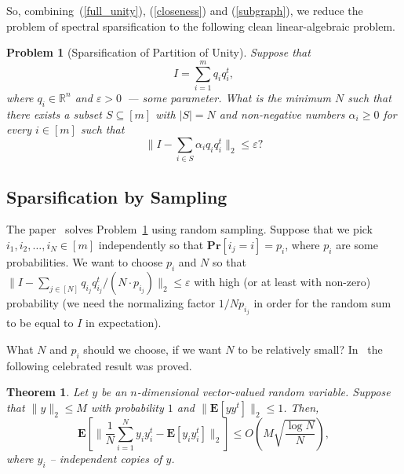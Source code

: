 \documentclass[12pt]{article}
\newcommand{\eps}{\varepsilon}
\newtheorem{theorem}{Theorem}
\newtheorem{problem}{Problem}
\begin{document}
    So, combining~(\ref{full_unity}), (\ref{closeness}) and (\ref{subgraph}),
    we reduce the problem of spectral sparsification to the following clean
    linear-algebraic problem.

    \begin{problem}[Sparsification of Partition of Unity]
        \label{spu}
        Suppose that
        $$
            I = \sum_{i=1}^m q_i q_i^t,
        $$
        where $q_i \in \mathbb{R}^n$
        and $\eps > 0$~--- some parameter.
        What is the minimum $N$ such that there exists a subset $S \subseteq [m]$ with
        $|S| = N$ and non-negative numbers $\alpha_i \geq 0$ for every $i \in [m]$ such that
        $$
            \|I - \sum_{i \in S} \alpha_i q_i q_i^t\|_2 \leq \eps?
        $$
    \end{problem}

    \subsection{Sparsification by Sampling}

    The paper~\cite{SS11} solves Problem~\ref{spu} using random sampling.
    Suppose that we pick $i_1, i_2, \ldots, i_N \in [m]$ independently so that
    $\mathbf{Pr}[i_j = i] = p_i$, where $p_i$ are some probabilities.
    We want to choose $p_i$ and $N$ so that
    $\|I - \sum_{j \in [N]} q_{i_j} q_{i_j}^t / (N\cdot p_{i_j})\|_2 \leq \eps$
    with high (or at least with non-zero) probability (we need the normalizing
    factor $1 / Np_{i_j}$ in order for the random sum to be equal to $I$ in expectation).

    What $N$ and $p_i$ should we choose, if we want $N$ to be relatively small?
    In~\cite{R96,RV07} the following celebrated result was proved.
    \begin{theorem}
        \label{rv_inequality}
        Let $y$ be an $n$-dimensional vector-valued random variable.
        Suppose that $\|y\|_2 \leq M$ with probability $1$ and
        $\|\mathbf{E}[yy^t]\|_2 \leq 1$. Then,
        \begin{equation}
            \label{rv_formula}
            \mathbf{E}[\|\frac{1}{N} \sum_{i = 1}^{N} y_i y_i^t - \mathbf{E}[y_i y_i^t]\|_2]
            \leq O\left(M \sqrt{\frac{\log N}{N}}\right),
        \end{equation}
        where $y_i$ -- independent copies of $y$.
    \end{theorem}
\end{document}
